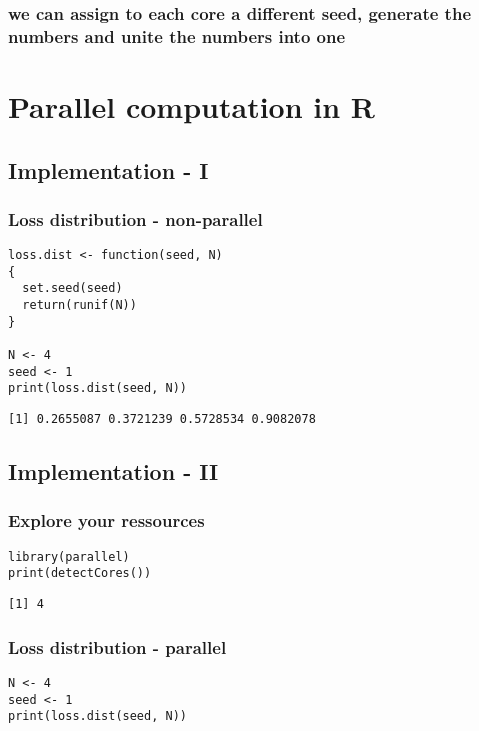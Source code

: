 \documentclass[bigger]{beamer}
\begin{document}
\subsubsection{we can assign to each core a different seed, generate the numbers and unite the numbers into one}
\label{sec-2-2-3}
\section{Parallel computation in R}
\label{sec-3}
\subsection{Implementation - I}
\label{sec-3-1}
\subsubsection{Loss distribution - non-parallel}
\label{sec-3-1-1}
\begin{verbatim}
loss.dist <- function(seed, N)
{
  set.seed(seed)
  return(runif(N))
}

N <- 4
seed <- 1
print(loss.dist(seed, N))
\end{verbatim}

\begin{verbatim}
[1] 0.2655087 0.3721239 0.5728534 0.9082078
\end{verbatim}

\subsection{Implementation - II}
\label{sec-3-2}
\subsubsection{Explore your ressources}
\label{sec-3-2-1}
\begin{verbatim}
library(parallel)
print(detectCores())
\end{verbatim}

\begin{verbatim}
[1] 4
\end{verbatim}

\subsubsection{Loss distribution - parallel}
\label{sec-3-2-2}
\begin{verbatim}
N <- 4
seed <- 1
print(loss.dist(seed, N))
\end{verbatim}
\end{document}
